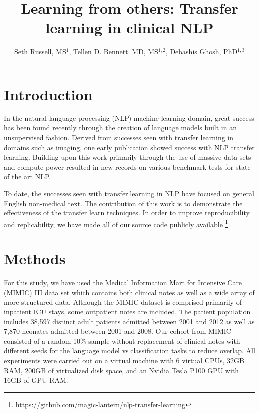 \documentclass{amia}
\begin{document}
\title{Learning from others: Transfer learning in clinical NLP}

\author{Seth Russell, MS$^{1}$,
    Tellen D. Bennett, MD, MS$^{1,2}$,
    Debashis Ghosh, PhD$^{1,3}$}


\maketitle

\section*{Introduction}

In the natural language processing (NLP) machine learning domain, great success has been found recently through the creation of language models built in an unsupervised fashion. Derived from successes seen with transfer learning in domains such as imaging, one early publication \cite{howard_universal_2018} showed success with NLP transfer learning. Building upon this work primarily through the use of massive data sets and compute power \cite{radford_improving_2018,radford_language_2019} resulted in new records on various benchmark tests for state of the art NLP.

To date, the successes seen with transfer learning in NLP have focused on general English non-medical text. The contribution of this work is to demonstrate the effectiveness of the transfer learn techniques. In order to improve reproducibility and replicability, we have made all of our source code publicly available \footnote{\url{https://github.com/magic-lantern/nlp-transfer-learning}}.

\section*{Methods}

For this study, we have used the Medical Information Mart for Intensive Care (MIMIC) III \cite{johnson_mimic-iii_2016} data set which contains both clinical notes as well as a wide array of more structured data. Although the MIMIC dataset is comprised primarily of inpatient ICU stays, some outpatient notes are included. The patient population includes 38,597 distinct adult patients admitted between 2001 and 2012 as well as 7,870 neonates admitted between 2001 and 2008. Our cohort from MIMIC consisted of a random 10\% sample without replacement of clinical notes with different seeds for the language model vs classification tasks to reduce overlap. All experiments were carried out on a virtual machine with 6 virtual CPUs, 32GB RAM, 200GB of virtualized disk space, and an Nvidia Tesla P100 GPU with 16GB of GPU RAM.
\end{document}
